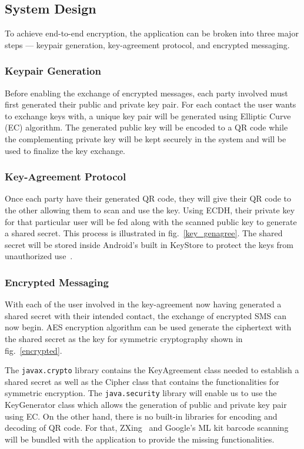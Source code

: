 \documentclass[journal]{./IEEE/IEEEtran}
\begin{document}
\subsection{System Design}
To achieve end-to-end encryption, the application can be broken into three
major steps --- keypair generation, key-agreement protocol, and
encrypted messaging.

\subsubsection{Keypair Generation}
Before enabling the exchange of encrypted messages, each party involved
must first generated their public and private key pair. For each contact the
user wants to exchange keys with, a unique key pair will be generated
using Elliptic Curve (EC) algorithm.
The generated public key will be encoded to a QR code while the complementing
private key will be kept securely in the system and will be used to finalize
the key exchange.

\subsubsection{Key-Agreement Protocol}
Once each party have their generated QR code, they will give their QR code to
the other allowing them to scan and use the key. Using ECDH, their private key
for that particular user will be fed along with the scanned public key to
generate a shared secret. This process is illustrated in fig.~\ref{key_genagree}.
The shared secret will be stored inside Android's built in KeyStore to protect
the keys from unauthorized use~\cite{android_keystore}.

\subsubsection{Encrypted Messaging}
With each of the user involved in the key-agreement now having generated a
shared secret with their intended contact, the exchange of encrypted SMS
can now begin. AES encryption algorithm can be used generate the ciphertext
with the shared secret as the key for symmetric cryptography shown in
fig.~\ref{encrypted}.

The \lstinline{javax.crypto} library contains the KeyAgreement class needed to
establish a shared secret as well as the Cipher class that contains the
functionalities for symmetric encryption. The \lstinline{java.security} library
will enable us to use the KeyGenerator class which allows the generation of
public and private key pair using EC. On the other hand, there is no built-in
libraries for encoding and decoding of QR code. For that, ZXing~\cite{zxing}
and Google's ML kit barcode scanning~\cite{mlkit} will be bundled with the
application to provide the missing functionalities.
\end{document}
